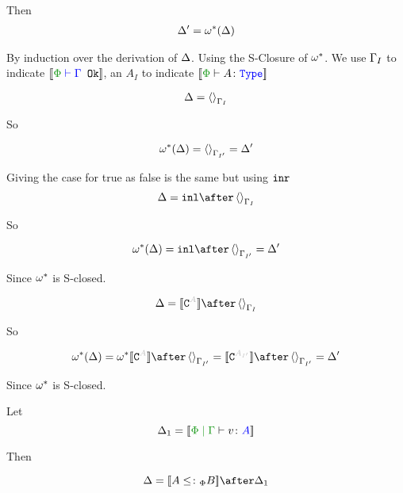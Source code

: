 \documentclass{report}
\begin{document}
Then \begin{eqnarray}
    \Delta' = \omega^*(\Delta)
\end{eqnarray}

\proof
By induction over the derivation of $\Delta$. Using the S-Closure of $\omega^*$. We use $\Gamma_I$ to indicate $\deno{\wellformedok{\P}{\G}}$, an $A_I$ to indicate $\deno{\typerelation{\P}{A}{\type}}$


\begin{equation}
    \Delta = \left\langle\right\rangle_{\Gamma_I}
\end{equation}

So

\begin{equation}
    \omega^*(\Delta) = \left\langle\right\rangle_{\Gamma_{I'}} = \Delta'
\end{equation}

Giving the case for true as false is the same but using $\texttt{inr}$
\begin{equation}
    \D = \inl\after\term{\G_I}
\end{equation}

So

\begin{equation}
    \w\star(\D) = \inl\after \term{\G_{I'}} = \D'
\end{equation}

Since $\omega^*$ is S-closed.



\begin{equation}
    \D = \deno{\const{A}}\after\term{\G_I}
\end{equation}

So

\begin{equation}
    \w\star(\D) = \w\star\deno{\const{A}}\after \term{\G_{I'}}=\deno{\const{A_{I'}}}\after \term{\G_{I'}}  = \D'
\end{equation}

Since $\omega^*$ is S-closed.


Let \begin{equation}
    \D_1 = \deno{\gpetyperelation{v}{A}}
\end{equation}

Then

\begin{equation}
    \D = \deno{A\subtypep B}\after \D_1\\
\end{equation}
\end{document}
